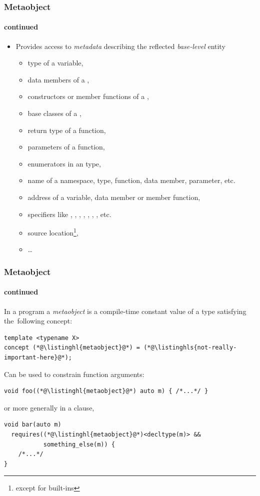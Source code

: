 \documentclass[aspectratio=169,compress,table,xcolor=table]{beamer}
\begin{document}
\begin{frame}
  \frametitle{Metaobject}
  \framesubtitle{continued}
  \larger
  \begin{itemize}
    \item Provides access to {\em metadata} describing the reflected
      {\em base-level} entity
      \begin{itemize}
      \smaller
        \item type of a variable,
        \item data members of a ,
        \item constructors or member functions of a ,
        \item base classes of a ,
        \item return type of a function,
        \item parameters of a function,
        \item enumerators in an  type,
        \item name of a namespace, type, function, data member, parameter, etc.
        \item address of a variable, data member or member function,
        \item specifiers like , ,
          , , ,
          , , etc.
        \item source location\footnote{except for built-ins},
        \item \ldots
      \end{itemize}
  \end{itemize}
\end{frame}
\begin{frame}[fragile]
  \frametitle{Metaobject}
  \framesubtitle{continued}
  \larger
  In a program a {\em metaobject} is a compile-time constant
    {\larger value} of a type satisfying the~following concept:
  \begin{lstlisting}[language=c++2x]
template <typename X>
concept (*@\listinghl{metaobject}@*) = (*@\listinghls{not-really-important-here}@*);
  \end{lstlisting}
  \vfill
  Can be used to constrain function arguments:
  \begin{lstlisting}[language=c++2x]
void foo((*@\listinghl{metaobject}@*) auto m) { /*...*/ }
  \end{lstlisting}
  or more generally in a  clause,
  \begin{lstlisting}[language=c++2x]
void bar(auto m)
  requires((*@\listinghl{metaobject}@*)<decltype(m)> &&
           something_else(m)) {
    /*...*/
}
  \end{lstlisting}
\end{frame}
\end{document}
